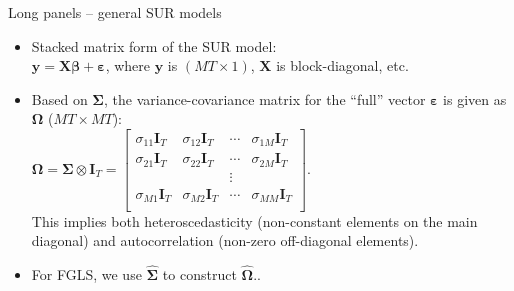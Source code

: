 \documentclass[usenames,dvipsnames]{beamer}
\begin{document}
\begin{frame}{Long panels -- general SUR models}
\small
\begin{itemize}
    \item Stacked matrix form of the SUR model:\\ \smallskip 
    $\bm{y} = \bm{X} \bm{\beta} + \bm{\varepsilon}$, \quad where $\bm{y}$ is $(MT\times 1)$, $\bm{X}$ is block-diagonal, etc.\\ \smallskip 
    \medskip
    \item Based on $\bm{\Sigma}$, the variance-covariance matrix for the ``full'' vector $\bm{\varepsilon}$ is given as $\bm{\Omega}$ ($MT \times MT$):\\ \medskip
    $\bm{\Omega} = \bm{\Sigma} \otimes \bm{I}_T = 
    \begin{bmatrix} 
    \sigma_{11} \bm{I}_T & \sigma_{12} \bm{I}_T & \cdots & \sigma_{1M} \bm{I}_T \\ 
    \sigma_{21} \bm{I}_T & \sigma_{22} \bm{I}_T & \cdots & \sigma_{2M} \bm{I}_T \\ 
      &   & \vdots &  \\ 
    \sigma_{M1} \bm{I}_T & \sigma_{M2} \bm{I}_T & \cdots & \sigma_{MM} \bm{I}_T \\ 
    \end{bmatrix}.$\\ \smallskip
    This implies both heteroscedasticity (non-constant elements on the main diagonal) and autocorrelation (non-zero off-diagonal elements).
    \medskip
    \item For FGLS, we use $\bm{\hat{\Sigma}}$ to construct $\bm{\hat{\Omega}}$..
\end{itemize}
\end{frame}
\end{document}
